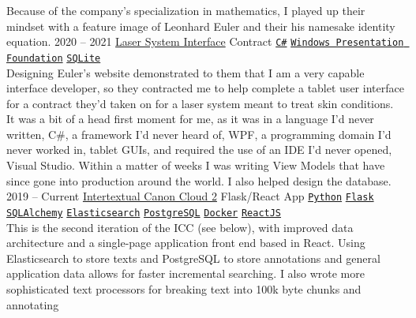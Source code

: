 \documentclass[9pt]{developercv} %
\begin{document}
\begin{entrylist}
{            Because of the company's specialization in mathematics, I played up
            their mindset with a feature image of Leonhard Euler and their
            his namesake identity equation.
        }
    \entry
        {2020 -- 2021}
        {\href{https://euler-sci.com}{Laser System Interface}}
        {Contract}
        {
            \texttt{{\href{https://en.wikipedia.org/wiki/C_Sharp_(programming_language)}{C\#}}}\slashsep
            \texttt{{\href{https://en.wikipedia.org/wiki/Windows_Presentation_Foundation}{Windows Presentation Foundation}}}\slashsep
            \texttt{{\href{https://www.sqlite.org/index.html}{SQLite}}}\\
            Designing Euler's website demonstrated to them that I am a very
            capable interface developer, so they contracted me to help complete
            a tablet user interface for a contract they'd taken on for a laser
            system meant to treat skin conditions. It was a bit of a head first
            moment for me, as it was in a language I'd never written, C\#, a
            framework I'd never heard of, WPF, a programming domain I'd never
            worked in, tablet GUIs, and required the use of an IDE I'd never
            opened, Visual Studio. Within a matter of weeks I was writing View
            Models that have since gone into production around the world. I also
            helped design the database.
        }
    \entry
        {2019 -- Current}
        {{\href{https://github.com/Anno-Wiki}{Intertextual Canon Cloud 2}}}
        {Flask/React App}
        {
            \texttt{{\href{https://www.python.org/}{Python}}}\slashsep
            \texttt{{\href{https://flask.palletsprojects.com/en/1.1.x/}{Flask}}}\slashsep
            \texttt{{\href{https://www.sqlalchemy.org/}{SQLAlchemy}}}\slashsep
            \texttt{{\href{https://www.elastic.co/}{Elasticsearch}}}\slashsep
            \texttt{{\href{https://www.postgresql.org/}{PostgreSQL}}}\slashsep
            \texttt{{\href{https://www.docker.com/}{Docker}}}\slashsep
            \texttt{{\href{https://reactjs.org/}{ReactJS}}}\\
            This is the second iteration of the ICC (see below), with improved
            data architecture and a single-page application front end based in
            React. Using Elasticsearch to store texts and PostgreSQL to store
            annotations and general application data allows for faster
            incremental searching. I also wrote more sophisticated text
            processors for breaking text into 100k byte chunks and annotating
}
\end{entrylist}
\end{document}
